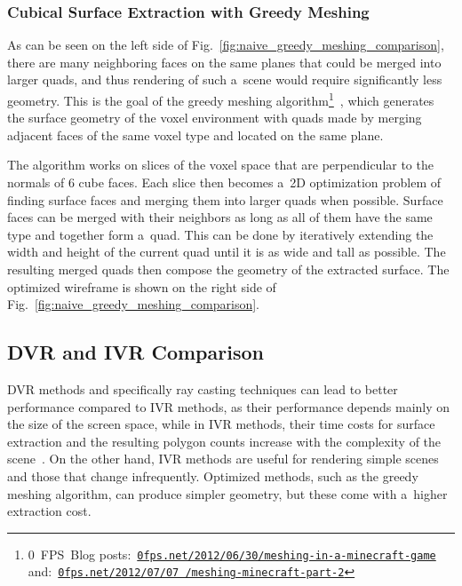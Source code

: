 \subsubsection{Cubical Surface Extraction with Greedy Meshing}
As can be seen on the left side of Fig.~\ref{fig:naive_greedy_meshing_comparison}, there are many neighboring faces on the same planes that could be merged into larger quads, and thus rendering of such a~scene would require significantly less geometry. This is the goal of the greedy meshing algorithm\footnote{0~FPS~Blog posts:~\href{https://0fps.net/2012/06/30/meshing-in-a-minecraft-game/}{\texttt{0fps.net/2012/06/30/meshing-in-a-minecraft-game}} and:~\href{https://0fps.net/2012/07/07/meshing-minecraft-part-2/}{\texttt{0fps.net/2012/07/07 /meshing-minecraft-part-2}}}~\cite{0fpsblog}, which generates the surface geometry of the voxel environment with quads made by merging adjacent faces of the same voxel type and located on the same plane.


The algorithm works on slices of the voxel space that are perpendicular to the normals of 6 cube faces. Each slice then becomes a~2D optimization problem of finding surface faces and merging them into larger quads when possible. Surface faces can be merged with their neighbors as long as all of them have the same type and together form a~quad. This can be done by iteratively extending the width and height of the current quad until it is as wide and tall as possible. The resulting merged quads then compose the geometry of the extracted surface. The optimized wireframe is shown on the right side of Fig.~\ref{fig:naive_greedy_meshing_comparison}.


\subsection{DVR and IVR Comparison}
DVR methods and specifically ray casting techniques can lead to better performance compared to IVR methods, as their performance depends mainly on the size of the screen space, while in IVR methods, their time costs for surface extraction and the resulting polygon counts increase with the complexity of the scene~\cite{voxels_polygons_voxel_rendering_comparison}. On the other hand, IVR methods are useful for rendering simple scenes and those that change infrequently. Optimized methods, such as the greedy meshing algorithm, can produce simpler geometry, but these come with a~higher extraction cost.



